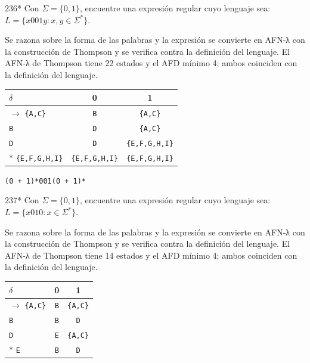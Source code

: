 \documentclass[11pt]{article}
\begin{document}
\begin{ejercicio}{236}{*}
Con $\Sigma = \{0, 1\}$, encuentre una expresión regular cuyo lenguaje sea: $L = \{x001y : x, y \in \Sigma^*\}$.
\end{ejercicio}
\proc Se razona sobre la forma de las palabras y la expresión se convierte en AFN-λ con la construcción de Thompson y se verifica contra la definición del lenguaje. El AFN-λ de Thompson tiene 22 estados y el AFD mínimo 4; ambos coinciden con la definición del lenguaje.
\begin{center}\small\begin{tabular}{lcc}\toprule
$\delta$ & 0 & 1 \\\midrule
$\to$ \texttt{\{A,C\}} & \texttt{B} & \texttt{\{A,C\}} \\
 \texttt{B} & \texttt{D} & \texttt{\{A,C\}} \\
 \texttt{D} & \texttt{D} & \texttt{\{E,F,G,H,I\}} \\
$*$ \texttt{\{E,F,G,H,I\}} & \texttt{\{E,F,G,H,I\}} & \texttt{\{E,F,G,H,I\}} \\
\bottomrule\end{tabular}\end{center}

\resp \texttt{(0 + 1)*001(0 + 1)*}


\begin{ejercicio}{237}{*}
Con $\Sigma = \{0, 1\}$, encuentre una expresión regular cuyo lenguaje sea: $L = \{x010 : x \in \Sigma^*\}$.
\end{ejercicio}
\proc Se razona sobre la forma de las palabras y la expresión se convierte en AFN-λ con la construcción de Thompson y se verifica contra la definición del lenguaje. El AFN-λ de Thompson tiene 14 estados y el AFD mínimo 4; ambos coinciden con la definición del lenguaje.
\begin{center}\small\begin{tabular}{lcc}\toprule
$\delta$ & 0 & 1 \\\midrule
$\to$ \texttt{\{A,C\}} & \texttt{B} & \texttt{\{A,C\}} \\
 \texttt{B} & \texttt{B} & \texttt{D} \\
 \texttt{D} & \texttt{E} & \texttt{\{A,C\}} \\
$*$ \texttt{E} & \texttt{B} & \texttt{D} \\
\bottomrule\end{tabular}\end{center}
\end{document}
